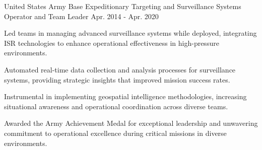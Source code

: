 \begin{cventries}
  \cventry
    {United States Army} %
    {Base Expeditionary Targeting and Surveillance Systems Operator and Team Leader} %
    {} %
    {Apr. 2014 - Apr. 2020} %
    {
      \begin{cvitems} %
      \item {Led teams in managing advanced surveillance systems while deployed, integrating ISR technologies to enhance operational effectiveness in high-pressure environments.}
    \item {Automated real-time data collection and analysis processes for surveillance systems, providing strategic insights that improved mission success rates.}
    \item {Instrumental in implementing geospatial intelligence methodologies, increasing situational awareness and operational coordination across diverse teams.}
    \item {Awarded the Army Achievement Medal for exceptional leadership and unwavering commitment to operational excellence during critical missions in diverse environments.}
      \end{cvitems}
    }
\end{cventries}
